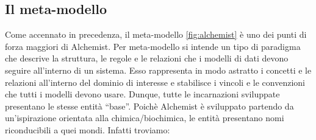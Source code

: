 \subsection{Il meta-modello} 
Come accennato in precedenza, il meta-modello \cref{fig:alchemist} è uno dei punti di forza maggiori di Alchemist. 
Per meta-modello si intende un tipo di paradigma che descrive la struttura, le regole e le relazioni
che i modelli di dati devono seguire all'interno di un sistema. Esso rappresenta in modo astratto i 
concetti e le relazioni all'interno del dominio di interesse e stabilisce i vincoli e le convenzioni
che tutti i modelli devono usare. Dunque, tutte le incarnazioni sviluppate presentano le stesse entità
``base''. Poichè Alchemist è sviluppato partendo da un'ispirazione orientata alla chimica/biochimica,
le entità presentano nomi riconducibili a quei mondi. Infatti troviamo:
